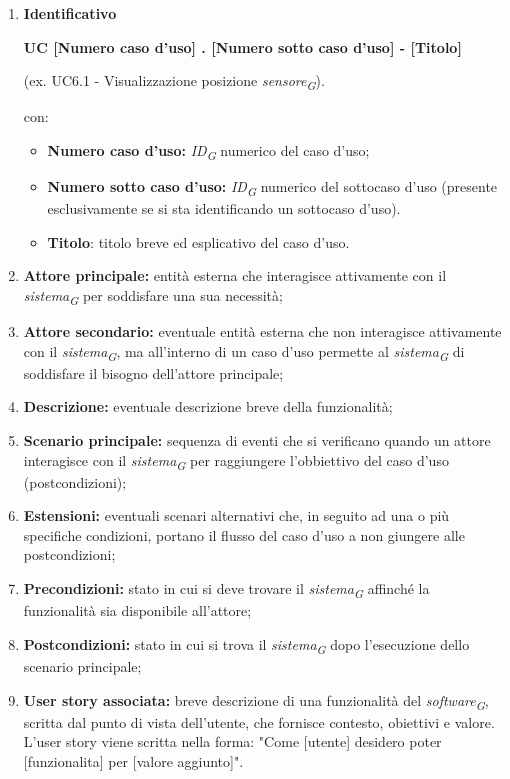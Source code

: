 \begin{enumerate}
    \item \textbf{Identificativo}
    \begin{center}
        \textbf{UC [Numero caso d'uso] . [Numero sotto caso d'uso] - [Titolo]}
    \end{center}
    (ex. UC6.1 - Visualizzazione posizione \textit{sensore}\textsubscript{\textit{G}}).
    
    con:

    \begin{itemize}
        \item \textbf{Numero caso d'uso:} \textit{ID}\textsubscript{\textit{G}} numerico del caso d'uso;
        \item \textbf{Numero sotto caso d'uso:} \textit{ID}\textsubscript{\textit{G}} numerico del sottocaso d'uso (presente esclusivamente se si sta identificando un sottocaso d'uso).
        \item \textbf{Titolo}: titolo breve ed esplicativo del caso d'uso.
    \end{itemize}

    \item \textbf{Attore principale:} entità esterna che interagisce attivamente con il \textit{sistema}\textsubscript{\textit{G}} per soddisfare una sua necessità;
    \item \textbf{Attore secondario:} eventuale entità esterna che non interagisce attivamente con il \textit{sistema}\textsubscript{\textit{G}}, ma all'interno di un caso d'uso permette al \textit{sistema}\textsubscript{\textit{G}} di soddisfare il bisogno dell'attore principale;
    \item \textbf{Descrizione:} eventuale descrizione breve della funzionalità;
    \item \textbf{Scenario principale:} sequenza di eventi che si verificano quando un attore interagisce con il \textit{sistema}\textsubscript{\textit{G}} per raggiungere l'obbiettivo del caso d'uso (postcondizioni);
    \item \textbf{Estensioni:} eventuali scenari alternativi che, in seguito ad una o più specifiche condizioni, portano il flusso del caso d'uso a non giungere alle postcondizioni;
    \item \textbf{Precondizioni:} stato in cui si deve trovare il \textit{sistema}\textsubscript{\textit{G}} affinché la funzionalità sia disponibile all'attore;
    \item \textbf{Postcondizioni:} stato in cui si trova il \textit{sistema}\textsubscript{\textit{G}} dopo l'esecuzione dello scenario principale;
    \item \textbf{User story associata:} breve descrizione di una funzionalità del \textit{software}\textsubscript{\textit{G}}, scritta dal punto di vista dell'utente, che fornisce contesto, obiettivi e valore. \\
    L'user story viene scritta nella forma: "Come [utente] desidero poter [funzionalita] per [valore aggiunto]".
\end{enumerate}

